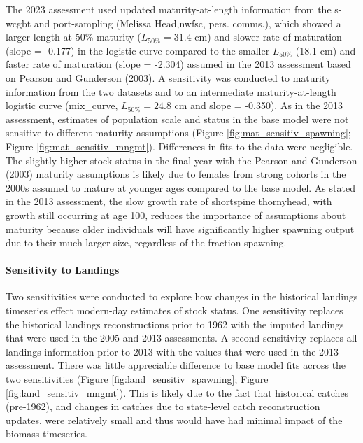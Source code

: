 \documentclass[11pt,
  letterpaper,
]{article}
\begin{document}
The 2023 assessment used updated maturity-at-length information from the \gls{s-wcgbt} and port-sampling (Melissa Head,\gls{nwfsc}, pers. comms.), which showed a larger length at 50\% maturity (\(L_{50\%} = 31.4\) cm) and slower rate of maturation (slope = -0.177) in the logistic curve compared to the smaller \(L_{50\%}\) (18.1 cm) and faster rate of maturation (slope = -2.304) assumed in the 2013 assessment based on Pearson and Gunderson (2003). A sensitivity was conducted to maturity information from the two datasets and to an intermediate maturity-at-length logistic curve (mix\_curve, \(L_{50\%} = 24.8\) cm and slope = -0.350). As in the 2013 assessment, estimates of population scale and status in the base model were not sensitive to different maturity assumptions (Figure \ref{fig:mat_sensitiv_spawning}; Figure \ref{fig:mat_sensitiv_mngmt}). Differences in fits to the data were negligible. The slightly higher stock status in the final year with the Pearson and Gunderson (2003) maturity assumptions is likely due to females from strong cohorts in the 2000s assumed to mature at younger ages compared to the base model. As stated in the 2013 assessment, the slow growth rate of shortspine thornyhead, with growth still occurring at age 100, reduces the importance of assumptions about maturity because older individuals will have significantly higher spawning output due to their much larger size, regardless of the fraction spawning.

\hypertarget{sensitivity-to-landings}{%
\paragraph{Sensitivity to Landings}\label{sensitivity-to-landings}}

Two sensitivities were conducted to explore how changes in the historical landings timeseries effect modern-day estimates of stock status. One sensitivity replaces the historical landings reconstructions prior to 1962 with the imputed landings that were used in the 2005 and 2013 assessments. A second sensitivity replaces all landings information prior to 2013 with the values that were used in the 2013 assessment. There was little appreciable difference to base model fits across the two sensitivities (Figure \ref{fig:land_sensitiv_spawning}; Figure \ref{fig:land_sensitiv_mngmt}). This is likely due to the fact that historical catches (pre-1962), and changes in catches due to state-level catch reconstruction updates, were relatively small and thus would have had minimal impact of the biomass timeseries.
\end{document}
